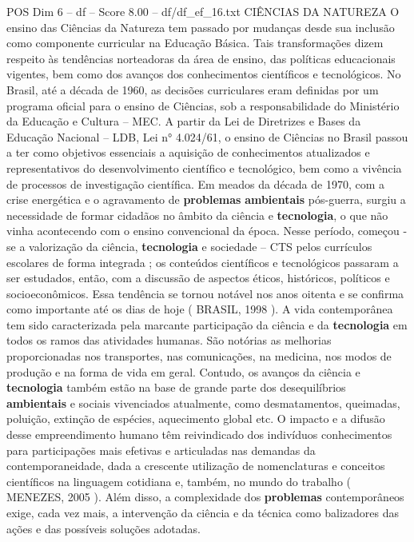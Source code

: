 \begin{textsample}{POS Dim 6 – df – Score 8.00 – df/df\_ef\_16.txt}  \label{ex:f6_pos_128}
CIÊNCIAS DA NATUREZA O ensino das Ciências da Natureza tem passado por mudanças desde sua inclusão como componente curricular na Educação Básica.
Tais transformações dizem respeito às tendências norteadoras da área de ensino, das políticas educacionais vigentes, bem como dos avanços dos conhecimentos científicos e tecnológicos.
No Brasil, até a década de 1960, as decisões curriculares eram definidas por um programa oficial para o ensino de Ciências, sob a responsabilidade do Ministério da Educação e Cultura – MEC.
A partir da Lei de Diretrizes e Bases da Educação Nacional – LDB, Lei n{\EmojiFont °} 4.024/61, o ensino de Ciências no Brasil passou a ter como objetivos essenciais a aquisição de conhecimentos atualizados e representativos do desenvolvimento científico e tecnológico, bem como a vivência de processos de investigação científica.
Em meados da década de 1970, com a crise energética e o agravamento de \textbf{problemas} \textbf{ambientais} pós-guerra, surgiu a necessidade de formar cidadãos no âmbito da ciência e \textbf{tecnologia}, o que não vinha acontecendo com o ensino convencional da época.
Nesse período, começou -se a valorização da ciência, \textbf{tecnologia} e sociedade – CTS pelos currículos escolares de forma integrada ; os conteúdos científicos e tecnológicos passaram a ser estudados, então, com a discussão de aspectos éticos, históricos, políticos e socioeconômicos.
Essa tendência se tornou notável nos anos oitenta e se confirma como importante até os dias de hoje ( BRASIL, 1998 ).
A vida contemporânea tem sido caracterizada pela marcante participação da ciência e da \textbf{tecnologia} em todos os ramos das atividades humanas.
São notórias as melhorias proporcionadas nos transportes, nas comunicações, na medicina, nos modos de produção e na forma de vida em geral.
Contudo, os avanços da ciência e \textbf{tecnologia} também estão na base de grande parte dos desequilíbrios \textbf{ambientais} e sociais vivenciados atualmente, como desmatamentos, queimadas, poluição, extinção de espécies, aquecimento global etc.
O impacto e a difusão desse empreendimento humano têm reivindicado dos indivíduos conhecimentos para participações mais efetivas e articuladas nas demandas da contemporaneidade, dada a crescente utilização de nomenclaturas e conceitos científicos na linguagem cotidiana e, também, no mundo do trabalho ( MENEZES, 2005 ).
Além disso, a complexidade dos \textbf{problemas} contemporâneos exige, cada vez mais, a intervenção da ciência e da técnica como balizadores das ações e das possíveis soluções adotadas.

\end{textsample}
